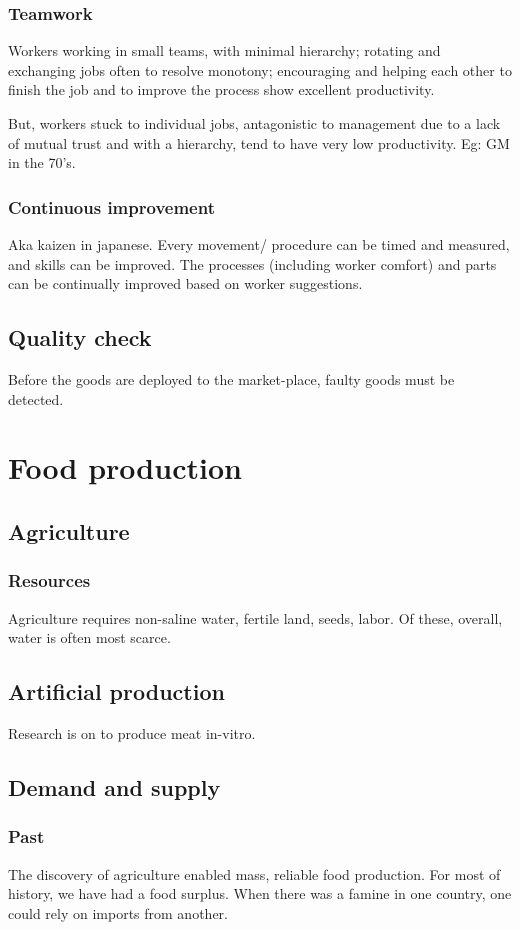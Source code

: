 \documentclass[oneside, article]{memoir}
\begin{document}
\subsection{Teamwork}
Workers working in small teams, with minimal hierarchy; rotating and exchanging jobs often to resolve monotony; encouraging and helping each other to finish the job and to improve the process show excellent productivity.

But, workers stuck to individual jobs, antagonistic to management due to a lack of mutual trust and with a hierarchy, tend to have very low productivity. Eg: GM in the 70's.

\subsection{Continuous improvement}
Aka kaizen in japanese. Every movement/ procedure can be timed and measured, and skills can be improved. The processes (including worker comfort) and parts can be continually improved based on worker suggestions.

\section{Quality check}
Before the goods are deployed to the market-place, faulty goods must be detected.

\chapter{Food production}
\section{Agriculture}
\subsection{Resources}
Agriculture requires non-saline water, fertile land, seeds, labor. Of these, overall, water is often most scarce.

\section{Artificial production}
Research is on to produce meat in-vitro.

\section{Demand and supply}
\subsection{Past}
The discovery of agriculture enabled mass, reliable food production. For most of history, we have had a food surplus. When there was a famine in one country, one could rely on imports from another.
\end{document}
